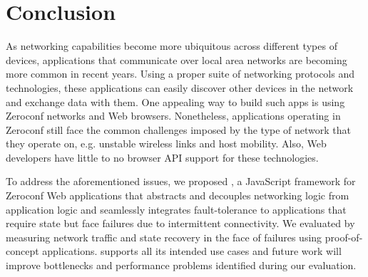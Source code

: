 \section{Conclusion}
\label{sec:conclusion}

As networking capabilities become more ubiquitous across different types of devices, applications that communicate over local area networks are becoming more common in recent years.
Using a proper suite of networking protocols and technologies, these applications can easily discover other devices in the network and exchange data with them.
One appealing way to build such apps is using Zeroconf networks and Web browsers.
Nonetheless, applications operating in Zeroconf still face the common challenges imposed by the type of network that they operate on, e.g. unstable wireless links and host mobility. 
Also, Web developers have little to no browser API support for these technologies.

To address the aforementioned issues, we proposed \APINameNoSpace, a JavaScript framework for Zeroconf Web applications that abstracts and decouples networking logic from application logic and seamlessly integrates fault-tolerance to applications that require state but face failures due to intermittent connectivity. We evaluated \APIName by measuring network traffic and state recovery in the face of failures using proof-of-concept applications. \APIName supports all its intended use cases and future work will improve bottlenecks and performance problems identified during our evaluation.
